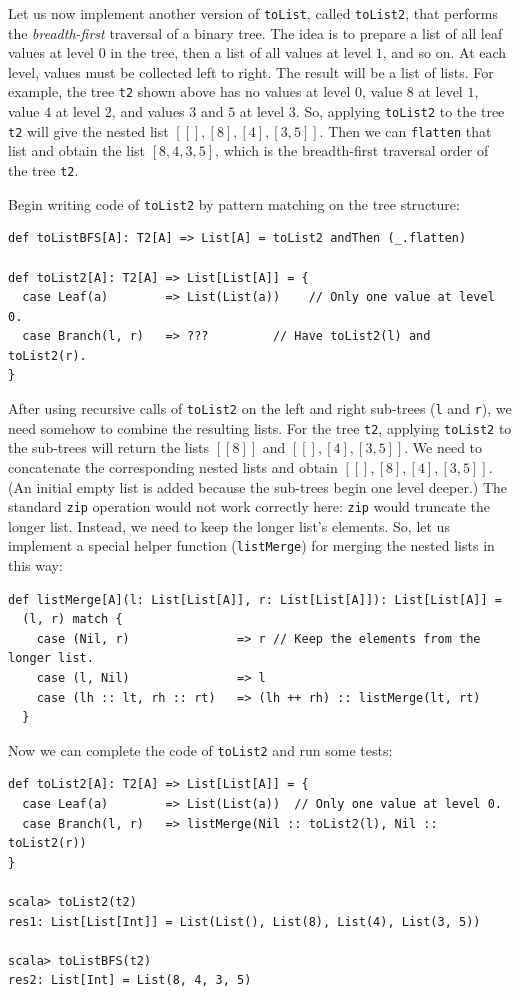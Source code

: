 Let us now implement another version of \lstinline!toList!, called
\lstinline!toList2!, that performs the \emph{breadth-first} traversal
of a binary tree. The idea is to prepare a list of all leaf values
at level $0$ in the tree, then a list of all values at level $1$,
and so on. At each level, values must be collected left to right.
The result will be a list of lists. For example, the tree \lstinline!t2!
shown above has no values at level $0$, value $8$ at level $1$,
value $4$ at level $2$, and values $3$ and $5$ at level $3$.
So, applying \lstinline!toList2! to the tree \lstinline!t2! will
give the nested list $\left[\left[\right],\left[8\right],\left[4\right],\left[3,5\right]\right]$.
Then we can \lstinline!flatten! that list and obtain the list $\left[8,4,3,5\right]$,
which is the breadth-first traversal order of the tree \lstinline!t2!. 

Begin writing code of \lstinline!toList2! by pattern matching on
the tree structure:
\begin{lstlisting}
def toListBFS[A]: T2[A] => List[A] = toList2 andThen (_.flatten)

def toList2[A]: T2[A] => List[List[A]] = {
  case Leaf(a)        => List(List(a))    // Only one value at level 0.
  case Branch(l, r)   => ???         // Have toList2(l) and toList2(r).
}
\end{lstlisting}
After using recursive calls of \lstinline!toList2! on the left and
right sub-trees (\lstinline!l! and \lstinline!r!), we need somehow
to combine the resulting lists. For the tree \lstinline!t2!, applying
\lstinline!toList2! to the sub-trees will return the lists $\left[\left[8\right]\right]$
and $\left[\left[\right],\left[4\right],\left[3,5\right]\right]$.
We need to concatenate the corresponding nested lists and obtain $\left[\left[\right],\left[8\right],\left[4\right],\left[3,5\right]\right]$.
(An initial empty list is added because the sub-trees begin one level
deeper.) The standard \lstinline!zip! operation would not work correctly
here: \lstinline!zip! would truncate the longer list. Instead, we
need to keep the longer list\textsf{'}s elements. So, let us implement a special
helper function (\lstinline!listMerge!) for merging the nested lists
in this way:
\begin{lstlisting}
def listMerge[A](l: List[List[A]], r: List[List[A]]): List[List[A]] =
  (l, r) match {
    case (Nil, r)               => r // Keep the elements from the longer list.
    case (l, Nil)               => l
    case (lh :: lt, rh :: rt)   => (lh ++ rh) :: listMerge(lt, rt)
  }
\end{lstlisting}
Now we can complete the code of \lstinline!toList2! and run some
tests:
\begin{lstlisting}
def toList2[A]: T2[A] => List[List[A]] = {
  case Leaf(a)        => List(List(a))  // Only one value at level 0.
  case Branch(l, r)   => listMerge(Nil :: toList2(l), Nil :: toList2(r))
}

scala> toList2(t2)
res1: List[List[Int]] = List(List(), List(8), List(4), List(3, 5))

scala> toListBFS(t2)
res2: List[Int] = List(8, 4, 3, 5)
\end{lstlisting}

